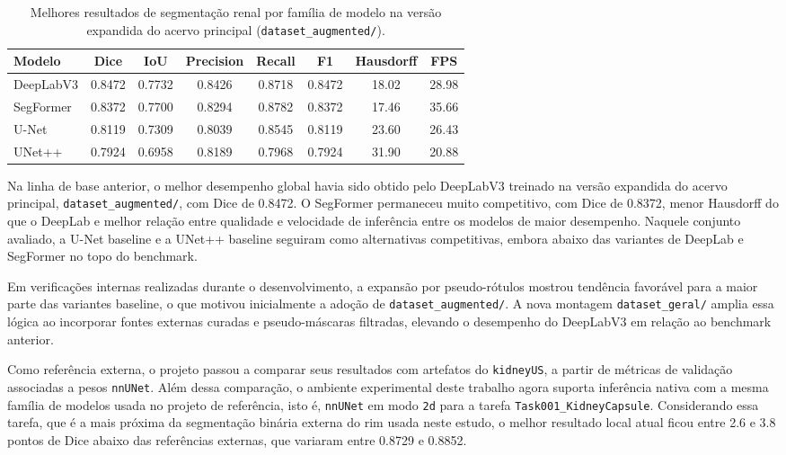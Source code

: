 \documentclass[12pt]{article}
\begin{document}
\begin{table}[H]
\centering
\caption{Melhores resultados de segmentação renal por família de modelo na versão expandida do acervo principal (\texttt{dataset\_augmented/}).}
\label{tab:benchmark_segmentacao}
\begin{tabular}{lccccccc}
\hline
\textbf{Modelo} & \textbf{Dice} & \textbf{IoU} & \textbf{Precision} & \textbf{Recall} & \textbf{F1} & \textbf{Hausdorff} & \textbf{FPS} \\
\hline
DeepLabV3 & 0.8472 & 0.7732 & 0.8426 & 0.8718 & 0.8472 & 18.02 & 28.98 \\
SegFormer & 0.8372 & 0.7700 & 0.8294 & 0.8782 & 0.8372 & 17.46 & 35.66 \\
U-Net & 0.8119 & 0.7309 & 0.8039 & 0.8545 & 0.8119 & 23.60 & 26.43 \\
UNet++ & 0.7924 & 0.6958 & 0.8189 & 0.7968 & 0.7924 & 31.90 & 20.88 \\
\hline
\end{tabular}
\end{table}

Na linha de base anterior, o melhor desempenho global havia sido obtido pelo DeepLabV3 treinado na versão expandida do acervo principal, \texttt{dataset\_augmented/}, com Dice de 0.8472. O SegFormer permaneceu muito competitivo, com Dice de 0.8372, menor Hausdorff do que o DeepLab e melhor relação entre qualidade e velocidade de inferência entre os modelos de maior desempenho. Naquele conjunto avaliado, a U-Net baseline e a UNet++ baseline seguiram como alternativas competitivas, embora abaixo das variantes de DeepLab e SegFormer no topo do benchmark.

Em verificações internas realizadas durante o desenvolvimento, a expansão por pseudo-rótulos mostrou tendência favorável para a maior parte das variantes baseline, o que motivou inicialmente a adoção de \texttt{dataset\_augmented/}. A nova montagem \texttt{dataset\_geral/} amplia essa lógica ao incorporar fontes externas curadas e pseudo-máscaras filtradas, elevando o desempenho do DeepLabV3 em relação ao benchmark anterior.

Como referência externa, o projeto passou a comparar seus resultados com artefatos do \texttt{kidneyUS}, a partir de métricas de validação associadas a pesos \texttt{nnUNet}. Além dessa comparação, o ambiente experimental deste trabalho agora suporta inferência nativa com a mesma família de modelos usada no projeto de referência, isto é, \texttt{nnUNet} em modo \texttt{2d} para a tarefa \texttt{Task001\_KidneyCapsule}. Considerando essa tarefa, que é a mais próxima da segmentação binária externa do rim usada neste estudo, o melhor resultado local atual ficou entre 2.6 e 3.8 pontos de Dice abaixo das referências externas, que variaram entre 0.8729 e 0.8852.
\end{document}
